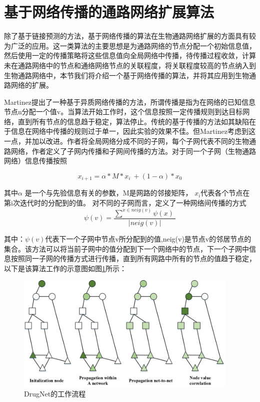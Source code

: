 \section{基于网络传播的通路网络扩展算法}
除了基于链接预测的方法，基于网络传播的算法在生物通路网络扩展的方面具有较为广泛的应用。这一类算法的主要思想是为通路网络的节点分配一个初始信息值，然后使用一定的传播策略将这些信息值向全局网络中传播，待传播过程收敛，计算未在通路网络中的节点和通络网络节点的关联程度，将关联程度较高的节点纳入到生物通路网络中，本节我们将介绍一个基于网络传播的算法，并将其应用到生物通路网络的扩展。

Martinez\cite{martinez2015drugnet}提出了一种基于异质网络传播的方法，所谓传播是指为在网络的已知信息节点n分配一个值v。当算法开始工作时，这个信息按照一定传播规则到达目标网络，直到所有节点的信息趋于稳定，算法停止。传统的基于传播的方法如\cite{vanunu2010associating}其缺陷在于信息在网络中传播的规则过于单一，因此实验的效果不佳。但Martinez\cite{martinez2015drugnet}考虑到这一点，并加以改进。作者将全局网络分成不同的子网，每个子网代表不同的生物通路网络，作者定义了子网内传播和子网间传播的方法。对于同一个子网（生物通路网络）信息传播按照

\begin{equation}
x_{i+1} =\alpha *M*x_{i} \ +( 1-\alpha ) *x_{0}
\label{eq321}
\end{equation}

其中$\alpha$ 是一个与先验信息有关的参数，M是网路的邻接矩阵， $x_{i}$代表各个节点在第i次迭代时的分配到的值。 对不同的子网而言，定义了一种网络间传播的方式
\begin{equation}
\psi (v) =\frac{\sum ^{x\in neig(v)} \psi (x) \ }{|neig(v) |}
\label{eq322}
\end{equation}

其中：$\psi(v)$代表下一个子网中节点v所分配到的值,neig(v)是节点v的邻居节点的集合。该方法可以将当前子网中的值分配到下一个网络中的节点，下一个子网中信息按照同一子网的传播方式进行传播，直到所有网路中所有的节点的值趋于稳定，以下是该算法工作的示意图如图\ref{fig41}所示：

\begin{figure}[h]
\centering
\includegraphics[width = 0.95\textwidth]{workflow}
\caption[fig41]{DrugNet的工作流程}
\label{fig41}
\end{figure}


